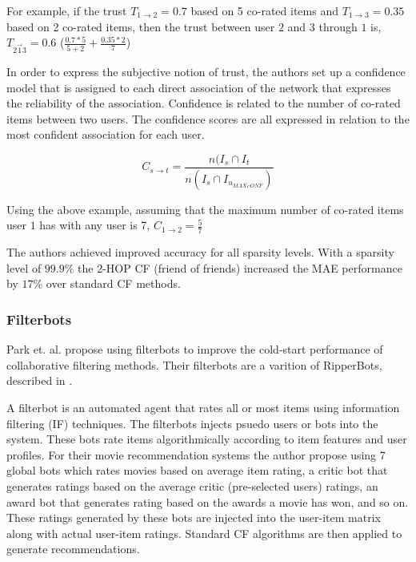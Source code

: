 For example, if the trust $T_{1 \rightarrow 2} = 0.7$ based on 5 co-rated items
and $T_{1 \rightarrow 3} = 0.35$ based on 2 co-rated items, then the trust
between user $2$ and $3$ through $1$ is, $T_{2 \overrightarrow{1} 3} = 0.6$
($\frac{0.7*5}{5+2} + \frac{0.35*2}{7}$)

In order to express the subjective notion of trust, the authors set up a
confidence model that is assigned to each direct association of the network
that expresses the reliability of the association. Confidence is related to the
number of co-rated items between two users. The confidence scores are all
expressed in relation to the most confident association for each user.

\begin{equation}
C_{s \rightarrow t} = \frac{n(I_{s} \cap I_{t}}{n(I_{s} \cap I_{u_{MAX_CONF}})} 
\end{equation}

Using the above example, assuming that the maximum number of co-rated items
user $1$ has with any user is 7, $C_{1 \rightarrow 2} = \frac{5}{7}$

The authors achieved improved accuracy for all sparsity levels. With a sparsity
level of $99.9\%$ the 2-HOP CF (friend of friends) increased the MAE
performance by $17\%$ over standard CF methods.







\subsubsection{Filterbots}


Park et. al. \cite{Park2006} propose using filterbots to improve the cold-start
performance of collaborative filtering methods. Their filterbots are a varition of RipperBots, described in \cite{Good1999}.

A filterbot is an automated agent that rates all or most items using information filtering (IF) techniques. The filterbots injects psuedo
users or bots into the system. These bots rate items algorithmically according to item features and user profiles. For their movie recommendation systems the author propose using 7 global bots which rates movies based on average item rating, a critic bot that generates ratings based on the average critic (pre-selected users) ratings, an award bot that generates rating based on the awards a movie has won, and so on. These ratings generated by these bots are injected into the user-item matrix along with actual user-item ratings. Standard CF algorithms are then applied to generate
recommendations. 

